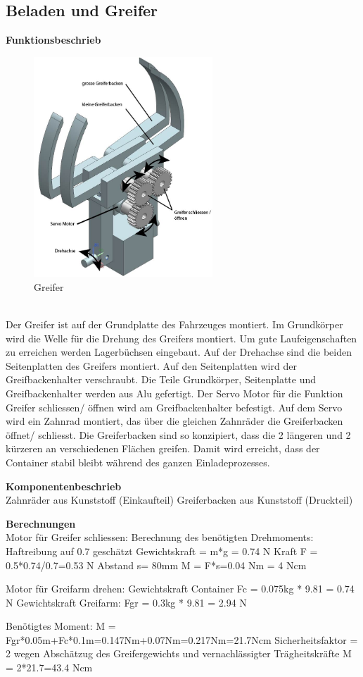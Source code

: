 \subsection{Beladen und Greifer}

\textbf{Funktionsbeschrieb}
\\[0.2cm]
\begin{figure}[H]%
\centering
\includegraphics[width=0.6\textwidth]{03_Loesungskonzept/pictures/greifer2.jpg}
\caption{Greifer}
\label{fig:activityRoute}
\end{figure}\\

Der Greifer ist auf der Grundplatte des Fahrzeuges montiert. Im Grundkörper wird die Welle für die Drehung des Greifers montiert. Um gute Laufeigenschaften zu erreichen werden Lagerbüchsen eingebaut. Auf der Drehachse sind die beiden Seitenplatten des Greifers montiert. Auf den Seitenplatten wird der Greifbackenhalter verschraubt. Die Teile Grundkörper, Seitenplatte und Greifbackenhalter werden aus Alu gefertigt. Der Servo Motor für die Funktion Greifer schliessen/ öffnen wird am Greifbackenhalter befestigt. Auf dem Servo wird ein Zahnrad montiert, das über die gleichen Zahnräder die Greiferbacken öffnet/ schliesst. Die Greiferbacken sind so konzipiert, dass die 2 längeren und 2 kürzeren an verschiedenen Flächen greifen. Damit wird erreicht, dass der Container stabil bleibt während des ganzen Einladeprozesses. 

\textbf{Komponentenbeschrieb}
\\[0.2cm]
Zahnräder aus Kunststoff (Einkaufteil)
Greiferbacken aus Kunststoff (Druckteil)
 
\textbf{Berechnungen}
\\[0.2cm]
Motor für Greifer schliessen:
Berechnung des benötigten Drehmoments: 
Haftreibung auf 0.7 geschätzt
Gewichtskraft = m*g = 0.74 N
Kraft F = 0.5*0.74/0.7=0.53 N
Abstand s= 80mm
M = F*s=0.04 Nm = 4 Ncm

Motor für Greifarm drehen:
Gewichtskraft Container Fc = 0.075kg * 9.81 = 0.74 N
Gewichtskraft Greifarm: Fgr = 0.3kg * 9.81 = 2.94 N

Benötigtes Moment:
M = Fgr*0.05m+Fc*0.1m=0.147Nm+0.07Nm=0.217Nm=21.7Ncm
Sicherheitsfaktor = 2 wegen Abschätzug des Greifergewichts und vernachlässigter Trägheitskräfte
M = 2*21.7=43.4 Ncm 